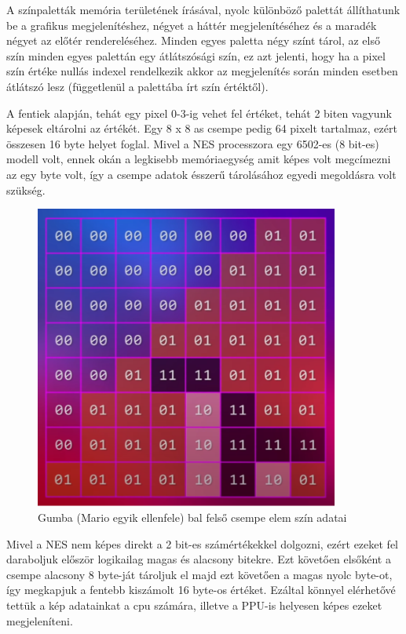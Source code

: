 	A színpaletták memória területének írásával, nyolc különböző palettát állíthatunk be a grafikus megjelenítéshez, négyet a háttér megjelenítéséhez és a maradék négyet az előtér rendereléséhez. Minden egyes paletta négy színt tárol, az első szín minden egyes palettán egy átlátszósági szín, ez azt jelenti, hogy ha a pixel szín értéke nullás indexel rendelkezik akkor az megjelenítés során minden esetben átlátszó lesz (függetlenül a palettába írt szín értéktől).
	
	A fentiek alapján, tehát egy pixel 0-3-ig vehet fel értéket, tehát 2 biten vagyunk képesek eltárolni az értékét. Egy 8 x 8 as csempe pedig 64 pixelt tartalmaz, ezért összesen 16 byte helyet foglal. Mivel a NES processzora egy 6502-es (8 bit-es) modell volt, ennek okán a legkisebb memóriaegység amit képes volt megcímezni az egy byte volt, így a csempe adatok ésszerű tárolásához egyedi megoldásra volt szükség.
	
	\begin{figure}[H]
		\centering
		\includegraphics[width=100mm, keepaspectratio]{figures/Gumba-tile}
		\caption{Gumba (Mario egyik ellenfele) bal felső csempe elem szín adatai}
		\label{fig:Gumba-tile}
	\end{figure}

	Mivel a NES nem képes direkt a 2 bit-es számértékekkel dolgozni, ezért ezeket fel daraboljuk először logikailag magas és alacsony bitekre. Ezt követően elsőként a csempe alacsony 8 byte-ját tároljuk el majd ezt követően a magas nyolc byte-ot, így megkapjuk a fentebb kiszámolt 16 byte-os értéket. Ezáltal könnyel elérhetővé tettük a kép adatainkat a cpu számára, illetve a PPU-is helyesen képes ezeket megjeleníteni.
	

